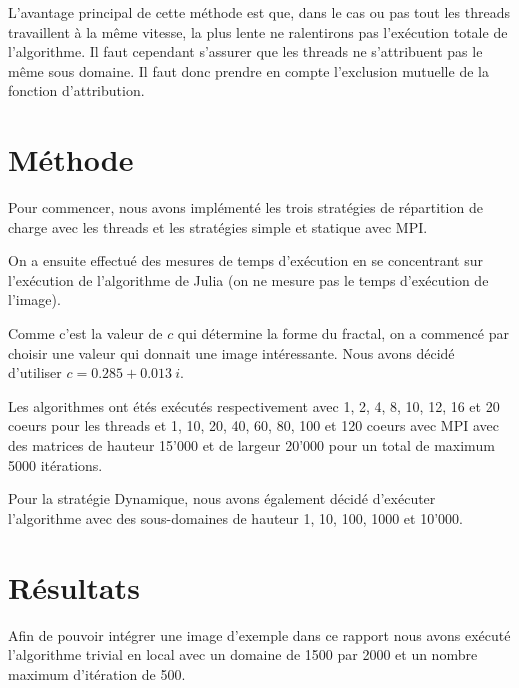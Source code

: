 \documentclass[12pt,a4paper,oneside, titlepage]{report}
\begin{document}
			L'avantage principal de cette méthode est que, dans le cas ou pas tout les threads travaillent à la même vitesse, la plus lente ne ralentirons pas l'exécution totale de l'algorithme.
			Il faut cependant s'assurer que les threads ne s'attribuent pas le même sous domaine. Il faut donc prendre en compte l'exclusion mutuelle de la fonction d'attribution.

	\section*{Méthode}
		 Pour commencer, nous avons implémenté les trois stratégies de répartition de charge avec les threads et les stratégies simple et statique avec MPI.

		On a ensuite effectué des mesures de temps d'exécution en se concentrant sur l'exécution de l'algorithme de Julia (on ne mesure pas le temps d'exécution de l'image).

		Comme c'est la valeur de $c$ qui détermine la forme du fractal, on a commencé par choisir une valeur qui donnait une image intéressante. Nous avons décidé d'utiliser $c = 0.285 + 0.013\ i$.

		Les algorithmes ont étés exécutés respectivement avec 1, 2, 4, 8, 10, 12, 16 et 20 coeurs pour les threads et 1, 10, 20, 40, 60, 80, 100 et 120 coeurs avec MPI avec des matrices de hauteur 15'000 et de largeur 20'000 pour un total de maximum 5000 itérations.

Pour la stratégie Dynamique, nous avons également décidé d'exécuter l'algorithme avec des sous-domaines de hauteur 1, 10, 100, 1000 et 10'000.

	\newpage
	\section*{Résultats}

 		Afin de pouvoir intégrer une image d'exemple dans ce rapport nous avons exécuté l'algorithme trivial en local avec un domaine de 1500 par 2000 et un nombre maximum d'itération de 500.
\end{document}
